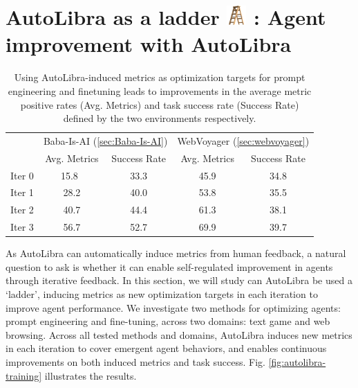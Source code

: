 \section{AutoLibra as a ladder \protect
\includegraphics[height=1em]{figs/ladder.png}
: Agent improvement with AutoLibra}
\label{sec:ladder}

\begin{table}[!h]
	\centering
	\begin{tabular}{rcccc}
		\toprule        & \multicolumn{2}{c}{Baba-Is-AI (\ref{sec:Baba-Is-AI})} & \multicolumn{2}{c}{WebVoyager (\ref{sec:webvoyager})} \\
		                & Avg. Metrics                                          & Success Rate                                         & Avg. Metrics & Success Rate \\
		\midrule Iter 0 & 15.8\                                                 & 33.3                                                 & 45.9         & 34.8         \\
		Iter 1          & 28.2                                                  & 40.0                                                 & 53.8         & 35.5         \\
		Iter 2          & 40.7                                                  & 44.4                                                 & 61.3         & 38.1         \\
		Iter 3          & 56.7                                                  & 52.7                                                 & 69.9         & 39.7         \\
		\bottomrule
	\end{tabular}
	\caption{Using AutoLibra-induced metrics as optimization targets for prompt
	engineering and finetuning leads to improvements in the average metric
	positive rates (Avg. Metrics) and task success rate (Success Rate) defined by the
	two environments respectively.}
	\label{tab:baba_wv_scores}
\end{table}
As AutoLibra can automatically induce metrics from human feedback, a natural
question to ask is whether it can enable self-regulated improvement in agents
through iterative feedback. In this section, we will study can AutoLibra be used
a `ladder', inducing metrics as new optimization targets in each iteration to improve
agent performance. We investigate two methods for optimizing agents: prompt engineering
and fine-tuning, across two domains: text game and web browsing. Across all
tested methods and domains, AutoLibra induces new metrics in each iteration to cover
emergent agent behaviors, and enables continuous improvements on both induced
metrics and task success. Fig. \ref{fig:autolibra-training} illustrates the
results.

